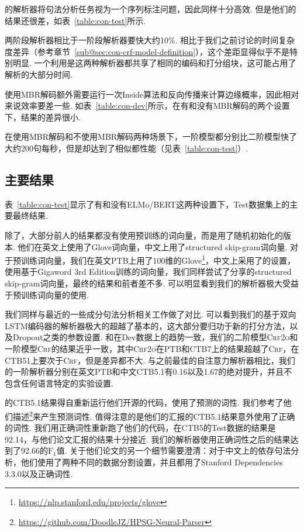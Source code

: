 \citep{gomez-rodriguez-vilares-2018-constituent}的解析器将句法分析任务视为一个序列标注问题，因此同样十分高效.
但是他们的结果还很差，如表~\ref{table:con-test}所示.

两阶段解析器相比于一阶段解析器要快大约10\%.
相比于我们之前讨论的时间复杂度差异（参考章节~\ref{sub@sec:con-crf-model-definition}），这个差距显得似乎不是特别明显.
一个利用是这两种解析器都共享了相同的编码和打分组块，这可能占用了解析的大部分时间.

使用MBR解码额外需要运行一次Inside算法和反向传播来计算边缘概率，因此相对来说效率要差一些.
如表~\ref{table:con-dev}所示，在有和没有MBR解码的两个设置下，结果的差异很小.

在使用MBR解码和不使用MBR解码两种场景下，一阶模型都分别比二阶模型快了大约200句每秒，但是却达到了相似都性能（见表~\ref{table:con-test}）.



\subsection{主要结果}
表~\ref{table:con-test}显示了有和没有ELMo/BERT这两种设置下，Test数据集上的主要最终结果.

除了\citet{zhou-zhao-2019-head}，大部分前人的结果都没有使用预训练的词向量，而是用了随机初始化的版本.
他们在英文上使用了Glove词向量，中文上用了structured skip-gram词向量.
对于预训练词向量，我们在英文PTB上用了100维的Glove\footnote{\url{https://nlp.stanford.edu/projects/glove}}，中文上采用了\citet{li-etal-2019-attentive}的设置，使用基于Gigaword 3rd Edition训练的词向量，我们同样尝试了\citet{zhou-zhao-2019-head}分享的structured skip-gram词向量，最终的结果和前者差不多.
可以明显看到我们的解析器极大受益于预训练词向量的使用.

我们同样与最近的一些成分句法分析相关工作做了对比.
可以看到我们的基于双向LSTM编码器的解析器极大的超越了基本的\citet{stern-etal-2017-minimal}，这大部分要归功于新的打分方法，以及Dropout之类的参数设置.
和在Dev数据上的趋势一致，我们的二阶模型\textsc{Crf2o}和一阶模型\textsc{Crf}的结果近乎一致，其中\textsc{Crf2o}在PTB和CTB7上的结果超越了\textsc{Crf}，在CTB51上要次于\textsc{Crf}，但是差异都不大.
与之前最佳的自注意力解析器相比\citet{kitaev-klein-2018-constituency}，我们的一阶解析器分别在英文PTB和中文CTB5.1有0.16以及1.67的绝对提升，并且不包含任何语言特定的实验设置.

\citet{zhou-zhao-2019-head}的CTB5.1结果得自重新运行他们开源的代码，使用了预测的词性.
我们参考了他们描述\footnote{\url{https://github.com/DoodleJZ/HPSG-Neural-Parser}}来产生预测词性.
值得注意的是他们的汇报的CTB5.1结果意外使用了正确的词性.
我们用正确词性重新跑了他们的代码，在CTB5的Test数据的结果是92.14，与他们论文汇报的结果十分接近.
我们的解析器使用正确词性之后的结果达到了92.66的$\mathrm{F}_1$值.
关于他们论文的另一个细节需要澄清：对于中文上的依存句法分析，他们使用了两种不同的数据分割设置，并且都用了Stanford Dependencies 3.3.0以及正确词性.

